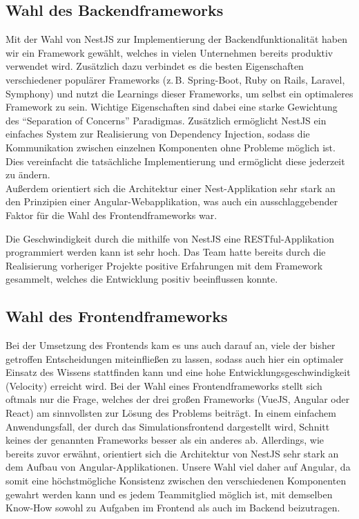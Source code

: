\subsection*{Wahl des Backendframeworks}

Mit der Wahl von NestJS zur Implementierung der Backendfunktionalität haben wir ein Framework gewählt, welches in vielen Unternehmen bereits produktiv verwendet wird. Zusätzlich dazu verbindet es die besten Eigenschaften verschiedener populärer Frameworks (z.\,B. Spring-Boot, Ruby on Rails, Laravel, Symphony) und nutzt die Learnings dieser Frameworks, um selbst ein optimaleres Framework zu sein. Wichtige Eigenschaften sind dabei eine starke Gewichtung des \enquote{Separation of Concerns} Paradigmas. Zusätzlich ermöglicht NestJS ein einfaches System zur Realisierung von Dependency Injection, sodass die Kommunikation zwischen einzelnen Komponenten ohne Probleme möglich ist.
Dies vereinfacht die tatsächliche Implementierung und ermöglicht diese jederzeit zu ändern.\\
Außerdem orientiert sich die Architektur einer Nest-Applikation sehr stark an den Prinzipien einer Angular-Webapplikation, was auch ein ausschlaggebender Faktor für die Wahl des Frontendframeworks war.

Die Geschwindigkeit durch die mithilfe von NestJS eine RESTful-Applikation programmiert werden kann ist sehr hoch. Das Team hatte bereits durch die Realisierung vorheriger Projekte positive Erfahrungen mit dem Framework gesammelt, welches die Entwicklung positiv beeinflussen konnte.

\subsection*{Wahl des Frontendframeworks}
Bei der Umsetzung des Frontends kam es uns auch darauf an, viele der bisher getroffen Entscheidungen miteinfließen zu lassen, sodass auch hier ein optimaler Einsatz des Wissens stattfinden kann und eine hohe Entwicklungsgeschwindigkeit (Velocity) erreicht wird. Bei der Wahl eines Frontendframeworks stellt sich oftmals nur die Frage, welches der drei großen Frameworks (VueJS, Angular oder React) am sinnvollsten zur Lösung des Problems beiträgt. In einem einfachem Anwendungsfall, der durch das Simulationsfrontend dargestellt wird, Schnitt keines der genannten Frameworks besser als ein anderes ab. Allerdings, wie bereits zuvor erwähnt, orientiert sich die Architektur von NestJS sehr stark an dem Aufbau von Angular-Applikationen. Unsere Wahl viel daher auf Angular, da somit eine höchstmögliche Konsistenz zwischen den verschiedenen Komponenten gewahrt werden kann und es jedem Teammitglied möglich ist, mit demselben Know-How sowohl zu Aufgaben im Frontend als auch im Backend beizutragen.




